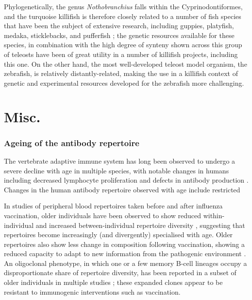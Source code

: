 
Phylogenetically, the genus \textit{Nothobranchius} falls within the Cyprinodontiformes, and the turquoise killifish is therefore closely related to a number of fish species that have been the subject of extensive research, including guppies, platyfish, medaka, sticklebacks, and pufferfish  \citep{terzibasi2007review} %
; the genetic resources available for these species, in combination with the high degree of synteny shown across this group of teleosts \citep{terzibasi2007review} have been of great utility in a number of killifish projects, including this one. On the other hand, the most well-developed teleost model organism, the zebrafish, is relatively distantly-related, making the use in a killifish context of genetic and experimental resources developed for the zebrafish more challenging.



\chapter{Misc.}

\subsection{Ageing of the antibody repertoire}


The vertebrate adaptive immune system has long been observed to undergo a severe decline with age in multiple species, with notable changes in humans including decreased lymphocyte proliferation \citep{debourcy2017ageing} and defects in antibody production \citep{debourcy2017ageing}. Changes in the human antibody repertoire observed with age include restricted

In studies of peripheral blood repertoires taken before and after influenza vaccination, older individuals have been observed to show reduced within-individual and increased between-individual repertoire diversity \citep{debourcy2017ageing}, suggesting that repertoires become increasingly (and divergently) specialised with age. Older repertoires also show less change in composition following vaccination, showing a reduced capacity to adapt to new information from the pathogenic environment \citep{debourcy2017ageing}. An oligoclonal phenotype, in which one or a few memory B-cell lineages occupy a disproportionate share of repertoire diversity, has been reported in a subset of older individuals in multiple studies \citep{debourcy2017ageing}; these expanded clones appear to be resistant to immunogenic interventions such as vaccination. 

